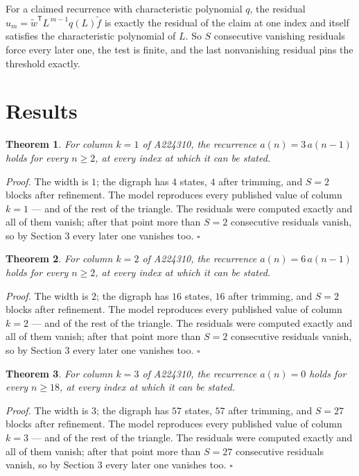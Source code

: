 \documentclass[11pt]{article}
\newtheorem{theorem}{Theorem}
\theoremstyle{definition}
\begin{document}
For a claimed recurrence with characteristic polynomial $q$, the residual $u_m = \tilde w^{\mathsf T}L^{\,m-1}q(L)\tilde f$ is exactly the residual of the claim at one index and itself satisfies the characteristic polynomial of $L$. So $S$ consecutive vanishing residuals force every later one, the test is finite, and the last nonvanishing residual pins the threshold exactly.

\section{Results}

\begin{theorem} For column $k = 1$ of A224310, the recurrence $a(n) = 3\,a(n-1)$ holds for every $n \ge 2$, at every index at which it can be stated.\end{theorem}

{\itshape Proof.} The width is $1$; the digraph has $4$ states, $4$ after trimming, and $S = 2$ blocks after refinement. The model reproduces every published value of column $k = 1$ --- and of the rest of the triangle. The residuals were computed exactly and all of them vanish; after that point more than $S = 2$ consecutive residuals vanish, so by Section 3 every later one vanishes too. $\square$

\begin{theorem} For column $k = 2$ of A224310, the recurrence $a(n) = 6\,a(n-1)$ holds for every $n \ge 2$, at every index at which it can be stated.\end{theorem}

{\itshape Proof.} The width is $2$; the digraph has $16$ states, $16$ after trimming, and $S = 2$ blocks after refinement. The model reproduces every published value of column $k = 2$ --- and of the rest of the triangle. The residuals were computed exactly and all of them vanish; after that point more than $S = 2$ consecutive residuals vanish, so by Section 3 every later one vanishes too. $\square$

\begin{theorem} For column $k = 3$ of A224310, the recurrence $a(n) = 0$ holds for every $n \ge 18$, at every index at which it can be stated.\end{theorem}

{\itshape Proof.} The width is $3$; the digraph has $57$ states, $57$ after trimming, and $S = 27$ blocks after refinement. The model reproduces every published value of column $k = 3$ --- and of the rest of the triangle. The residuals were computed exactly and all of them vanish; after that point more than $S = 27$ consecutive residuals vanish, so by Section 3 every later one vanishes too. $\square$
\end{document}
